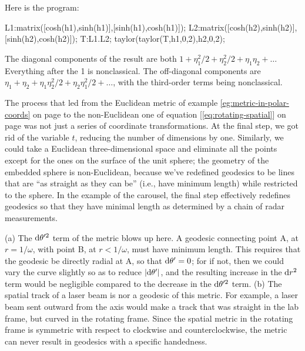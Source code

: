 

Here is the program:
\begin{listing}{1}
L1:matrix([cosh(h1),sinh(h1)],[sinh(h1),cosh(h1)]);
L2:matrix([cosh(h2),sinh(h2)],[sinh(h2),cosh(h2)]);
T:L1.L2;
taylor(taylor(T,h1,0,2),h2,0,2);
\end{listing}
The diagonal components of the result are both $1+\eta_1^2/2+\eta_2^2/2+\eta_1\eta_2+\ldots$
Everything after the 1 is nonclassical. The 
off-diagonal components are $\eta_1+\eta_2+\eta_1\eta_2^2/2+\eta_2\eta_1^2/2+\ldots$,
with the third-order terms being nonclassical.



The process that led from the Euclidean metric of example \ref{eg:metric-in-polar-coords} on page \pageref{eg:metric-in-polar-coords}
to the non-Euclidean one of equation [\ref{eq:rotating-spatial}] on page \pageref{eq:rotating-spatial} was not just a series
of coordinate transformations. At the final step, we got rid of the variable $t$, reducing the number of dimensions by one.
Similarly, we could take a Euclidean three-dimensional space and eliminate all the points except for the ones on the surface
of the unit sphere; the geometry of the embedded sphere is non-Euclidean, because we've redefined geodesics to be lines that
are ``as straight as they can be'' (i.e., have minimum length) while restricted to the sphere. In the example of the carousel, the final step effectively
redefines geodesics so that they have minimal length as determined by a chain of radar measurements.


(a) The $\textup{d}\theta'^2$ term of the metric blows up here. A geodesic connecting point A, at $r=1/\omega$, with point B, at $r<1/\omega$,
must have minimum length. This requires that the geodesic be directly radial at A, so that $\textup{d}\theta'=0$; for if not, then we could
vary the curve slightly so as to reduce $|\textup{d}\theta'|$, and the resulting increase in the $\textup{d} r^2$ term would be negligible
compared to the decrease in the $\textup{d}\theta'^2$ term. (b) The spatial track of a laser beam is nor a geodesic of this metric.
For example, a laser beam sent outward from the axis would make a track that was straight in the lab frame, but curved in the
rotating frame. Since the spatial metric in the rotating frame is symmetric with respect to clockwise and counterclockwise,
the metric can never result in geodesics with a specific handedness.

